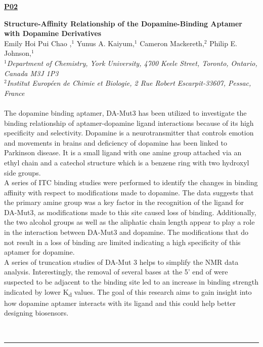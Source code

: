 \documentclass[titlepage,oneside,openany,10pt]{book}
\newenvironment{posterabs}[4] %
        {
	\begin{flushright}
                \underline{\textbf{#4}}
        \end{flushright}
        \textbf{#1}\\%
        #2\\%
        \textit{#3}\\\\%
        }
        {
        \\
        \noindent\rule{15cm}{0.5pt}%
        }
\begin{document}
\newpage

\begin{posterabs}
	{Structure-Affinity Relationship of the Dopamine-Binding Aptamer with Dopamine Derivatives}
	{Emily Hoi Pui Chao ,$^{1}$ Yunus A. Kaiyum,$^{1}$ Cameron Mackereth,$^{2}$ Philip E. Johnson,$^{1}$}
	{
	$^1$Department of Chemistry, York University, 4700 Keele Street, Toronto, Ontario, Canada M3J 1P3\\
	$^2$Institut Europ\'{e}en de Chimie et Biologie, 2 Rue Robert Escarpit-33607, Pessac, France
	}
	{P02}
	The dopamine binding aptamer, DA-Mut3 has been utilized to investigate the binding relationship of aptamer-dopamine ligand interactions because of its high specificity and selectivity. Dopamine is a neurotransmitter that controls emotion and movements in brains and deficiency of dopamine has been linked to Parkinson disease. It is a small ligand with one amine group attached via an ethyl chain and a catechol structure which is a benzene ring with two hydroxyl side groups.\\A series of ITC binding studies were performed to identify the changes in binding affinity with respect to modifications made to dopamine. The data suggests that the primary amine group was a key factor in the recognition of the ligand for DA-Mut3, as modifications made to this site caused loss of binding. Additionally, the two alcohol groups as well as the aliphatic chain length appear to play a role in the interaction between DA-Mut3 and dopamine. The modifications that do not result in a loss of binding are limited indicating a high specificity of this aptamer for dopamine.\\A series of truncation studies of DA-Mut 3 helps to simplify the NMR data analysis. Interestingly, the removal of several bases at the 5' end of were suspected to be adjacent to the binding site led to an increase in binding strength indicated by lower K\textsubscript{d} values­. The goal of this research aims to gain insight into how dopamine aptamer interacts with its ligand and this could help better designing biosensors.
	\label{ChaoE}
\end{posterabs}

\newpage
\end{document}
